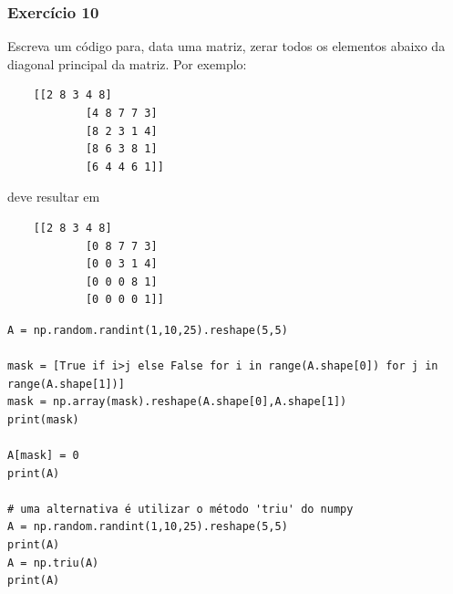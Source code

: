 \documentclass[../numerical_methods.tex]{subfiles}
\begin{document}
\subsubsection{Exercício 10}
Escreva um código para, data uma matriz, zerar todos os elementos abaixo da diagonal principal da matriz. Por exemplo:
\begin{verbatim}
	[[2 8 3 4 8]
			[4 8 7 7 3]
			[8 2 3 1 4]
			[8 6 3 8 1]
			[6 4 4 6 1]]
\end{verbatim}

deve resultar em
\begin{verbatim}
	[[2 8 3 4 8]
			[0 8 7 7 3]
			[0 0 3 1 4]
			[0 0 0 8 1]
			[0 0 0 0 1]]
\end{verbatim}

\begin{verbatim}
A = np.random.randint(1,10,25).reshape(5,5)

mask = [True if i>j else False for i in range(A.shape[0]) for j in range(A.shape[1])]
mask = np.array(mask).reshape(A.shape[0],A.shape[1])
print(mask)

A[mask] = 0
print(A)

# uma alternativa é utilizar o método 'triu' do numpy
A = np.random.randint(1,10,25).reshape(5,5)
print(A)
A = np.triu(A)
print(A)
\end{verbatim}
\end{document}
